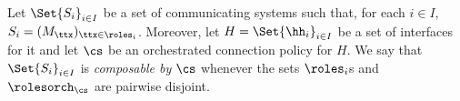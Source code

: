 
%



 \begin{definition}[Composability]
 \label{def:composability}
Let $\Set{S_i}_{i\in I}$ be a set of communicating systems such that, for each $i\in I$, $S_i=(M_{\ttx})_{\ttx\in\roles_i}$. 
Moreover, let $H=\Set{\hh_i}_{i\in I}$ be a set of interfaces for it and let
$\cs$ be an orchestrated connection policy for $H$.
We say that $\Set{S_i}_{i\in I}$ is {\em composable by} $\cs$ whenever
the  sets $\roles_i$s and $\rolesorch_{\cs}$ are  pairwise disjoint.
\end{definition} 


